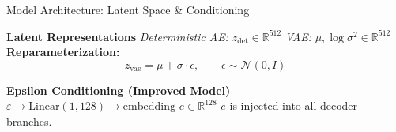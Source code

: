 \documentclass[aspectratio=169, 10pt]{beamer}
\begin{document}
\begin{frame}[fragile]{Model Architecture: Latent Space \& Conditioning}
    \centering
    \begin{algorithm}[H]
        \caption*{End-to-End Pipeline Overview (Part 2)}
        \begin{algorithmic}[1]
            
            \State \textbf{Latent Representations}
            \State \hspace{1em} \textit{Deterministic AE:} $z_{\mathrm{det}} \in \mathbb{R}^{512}$
            \State \hspace{1em} \textit{VAE:} $\mu, \log\sigma^2 \in \mathbb{R}^{512}$
            \State \hspace{1em} \textbf{Reparameterization:}
            \[
                z_{\mathrm{vae}} = \mu + \sigma \cdot \epsilon, \qquad \epsilon \sim \mathcal{N}(0,I)
            \]
            
            \Statex \hrulefill
            
            \State \textbf{Epsilon Conditioning (Improved Model)}
            \State \hspace{1em} $\varepsilon \rightarrow \text{Linear}(1,128) \rightarrow \text{embedding } e \in \mathbb{R}^{128}$
            \State \hspace{1em} $e$ is injected into all decoder branches.
            
        \end{algorithmic}
    \end{algorithm}
\end{frame}
\end{document}

